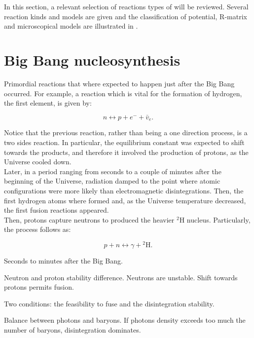 \documentclass[openany]{book}
\begin{document}
In this section, a relevant selection of reactions types of will be reviewed.  Several reaction kinds and models are given and the classification of potential, R-matrix and microscopical models are illustrated in \cite{descouvemont_2020}.



\section{Big Bang nucleosynthesis} \label{sec:BBN}

Primordial reactions that where expected to happen just after the Big Bang occurred. For example, a reaction which is vital for the formation of hydrogen, the first element, is given by: 

\begin{equation} \label{eq:reaction_BBN_nEqp}
	n \leftrightarrow p + e^{-} + \bar v_{e}. 
\end{equation}

Notice that the previous reaction, rather than being a one direction process, is a two sides reaction. In particular, the equilibrium constant was expected to shift towards the products, and therefore it involved the production of protons, as the Universe cooled down. \\

Later, in a period ranging from seconds to a couple of minutes after the beginning of the Universe, radiation damped to the point where atomic configurations were more likely than electromagnetic disintegrations. Then, the first hydrogen atoms where formed and, as the Universe temperature decreased, the first fusion reactions appeared.  \\

Then, protons capture neutrons to produced the heavier $\mathrm{{}^{2}H}$ nucleus. Particularly, the process follows as:

\begin{equation} \label{eq:reaction_BBN_pn}
	p + n \leftrightarrow \gamma + \mathrm{{}^{2}H}.
\end{equation}

Seconds to minutes after the Big Bang. 

Neutron and proton stability difference. Neutrons are unstable.  Shift towards protons permits fusion. 

Two conditions: the feasibility to fuse and the disintegration stability.

Balance between photons and baryons. If photons density exceeds too much the number of baryons, disintegration dominates. 
\end{document}
